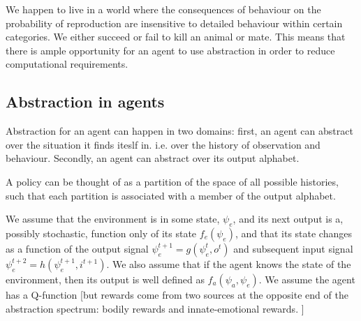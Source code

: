 \documentclass[a4paper]{article}
\begin{document}
We happen to live in a world where the consequences of behaviour on the probability of reproduction are insensitive to detailed behaviour within certain categories. We either succeed or fail to kill an animal or mate. This means that there is ample opportunity for an agent to use abstraction in order to reduce computational requirements.

\subsection{Abstraction in agents}

Abstraction for an agent can happen in two domains: first, an agent can abstract over the situation it finds iteslf in. i.e. over the history of observation and behaviour. Secondly, an agent can abstract over its output alphabet.

A policy can be thought of as a partition of the space of all possible histories, such that each partition is associated with a member of the output alphabet.

We assume that the environment is in some state, $\psi_e$, and its next output is a, possibly stochastic, function only of its state $f_e(\psi_e)$, and that its state changes as a function of the output signal $\psi_e^{t+1} = g(\psi_e^t,o^t)$ and subsequent input signal $\psi_e^{t+2} = h(\psi_e^{t+1},i^{t+1})$. We also assume that if the agent knows the state of the environment, then its output is well defined as $f_a(\psi_a,\psi_e)$. We assume the agent has a Q-function [but rewards come from two sources at the opposite end of the abstraction spectrum: bodily rewards and innate-emotional rewards. ]
\end{document}
